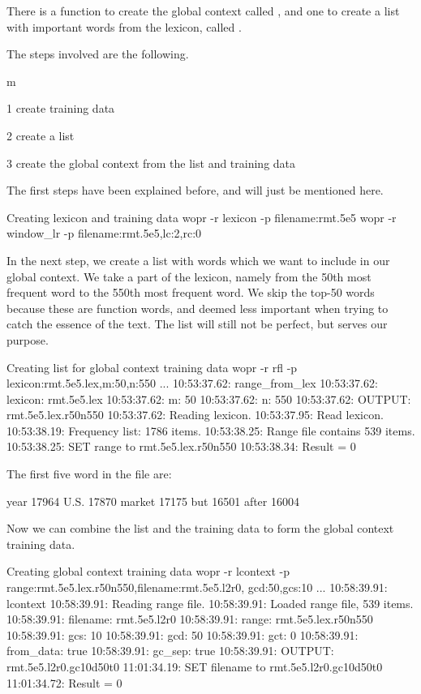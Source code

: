 \documentclass[a4paper,10pt,twoside]{report}
\begin{document}
There is a function to create the global context called
, and one to create a list with important words from the
lexicon, called .

The steps involved are the following.

\begin{varlist}{m}
\item[1] create training data
\item[2] create a list
\item[3] create the global context from the list and training data
\end{varlist}

The first steps have been explained before, and will just be mentioned
here.

\begin{bash}{Creating lexicon and training data}
wopr -r lexicon -p filename:rmt.5e5
wopr -r window_lr -p filename:rmt.5e5,lc:2,rc:0
\end{bash}

In the next step, we create a list with words which we want to include
in our global context. We take a part of the lexicon, namely from the
50th most frequent word to the 550th most frequent word. We skip the
top-50 words because these are function words, and deemed less
important when trying to catch the essence of the text. The list will
still not be perfect, but serves our purpose.

\begin{bash}{Creating list for global context training data}
wopr -r rfl -p lexicon:rmt.5e5.lex,m:50,n:550
...
10:53:37.62: range_from_lex
10:53:37.62:  lexicon: rmt.5e5.lex
10:53:37.62:  m:       50
10:53:37.62:  n:       550
10:53:37.62:  OUTPUT:  rmt.5e5.lex.r50n550
10:53:37.62: Reading lexicon.
10:53:37.95: Read lexicon.
10:53:38.19: Frequency list: 1786 items.
10:53:38.25: Range file contains 539 items.
10:53:38.25: SET range to rmt.5e5.lex.r50n550
10:53:38.34: Result = 0
\end{bash}

The first five word in the file are:

\begin{wout}{}
year 17964
U.S. 17870
market 17175
but 16501
after 16004
\end{wout}

Now we can combine the list and the training data to form the global
context training data.

\begin{bash}{Creating global context training data}
wopr -r lcontext -p range:rmt.5e5.lex.r50n550,filename:rmt.5e5.l2r0,
                    gcd:50,gcs:10
...
10:58:39.91: lcontext
10:58:39.91: Reading range file.
10:58:39.91: Loaded range file, 539 items.
10:58:39.91:  filename:  rmt.5e5.l2r0
10:58:39.91:  range:     rmt.5e5.lex.r50n550
10:58:39.91:  gcs:       10
10:58:39.91:  gcd:       50
10:58:39.91:  gct:       0
10:58:39.91:  from_data: true
10:58:39.91:  gc_sep:    true
10:58:39.91:  OUTPUT:    rmt.5e5.l2r0.gc10d50t0
11:01:34.19: SET filename to rmt.5e5.l2r0.gc10d50t0
11:01:34.72: Result = 0
\end{bash}
\end{document}
